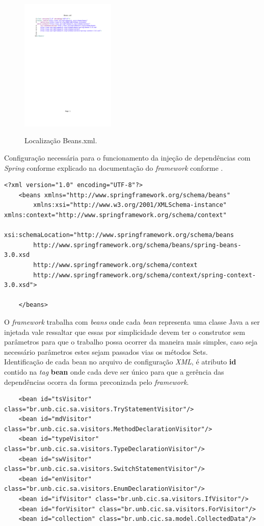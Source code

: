 \begin{figure}[h]
	\center
	\includegraphics[width=0.4\textwidth]{Imagens/Beans}
	\label{fig:Beans}
	\caption{Localização Beans.xml.}
\end{figure}
\clearpage

Configuração necessária para o funcionamento da injeção de dependências com {\it Spring} conforme explicado na documentação do {\it framework} conforme \cite{SPRING_REF}.\\
\begin{lstlisting}
<?xml version="1.0" encoding="UTF-8"?>
	<beans xmlns="http://www.springframework.org/schema/beans"
		xmlns:xsi="http://www.w3.org/2001/XMLSchema-instance" xmlns:context="http://www.springframework.org/schema/context"
		xsi:schemaLocation="http://www.springframework.org/schema/beans 
		http://www.springframework.org/schema/beans/spring-beans-3.0.xsd
		http://www.springframework.org/schema/context 
		http://www.springframework.org/schema/context/spring-context-3.0.xsd">

	</beans>
\end{lstlisting}


O {\it framework} trabalha com \textit{beans} onde cada \textit{bean} representa uma classe Java a ser injetada vale ressaltar que essas por simplicidade devem ter o construtor sem parâmetros para que o trabalho possa ocorrer da maneira mais simples, caso seja necessário parâmetros estes sejam passados vias os métodos Sets.\\

Identificação de cada bean no arquivo de configuração \textit{XML}, é atributo \textbf{id} contido na {\it tag} \textbf{bean} onde cada deve ser único para que a gerência das dependências ocorra da forma preconizada pelo {\it framework}.\\
\begin{lstlisting}
	<bean id="tsVisitor" class="br.unb.cic.sa.visitors.TryStatementVisitor"/>
	<bean id="mdVisitor" class="br.unb.cic.sa.visitors.MethodDeclarationVisitor"/>
	<bean id="typeVisitor" class="br.unb.cic.sa.visitors.TypeDeclarationVisitor"/>
	<bean id="swVisitor" class="br.unb.cic.sa.visitors.SwitchStatementVisitor"/>
	<bean id="enVisitor" class="br.unb.cic.sa.visitors.EnumDeclarationVisitor"/>
	<bean id="ifVisitor" class="br.unb.cic.sa.visitors.IfVisitor"/>
	<bean id="forVisitor" class="br.unb.cic.sa.visitors.ForVisitor"/>
	<bean id="collection" class="br.unb.cic.sa.model.CollectedData"/>
\end{lstlisting}
\clearpage

